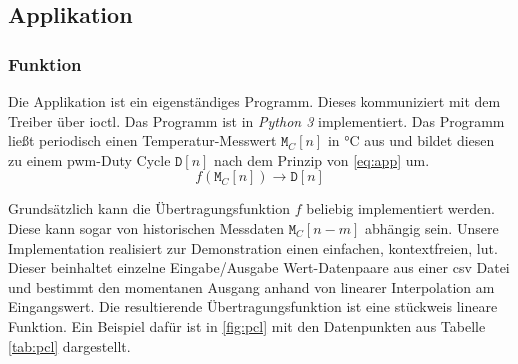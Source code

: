 \subsection{Applikation}

\subsubsection{Funktion}

Die Applikation ist ein eigenständiges Programm.
Dieses kommuniziert mit dem Treiber über \gls{ioctl}.
Das Programm ist in \textit{Python 3} implementiert.
Das Programm ließt periodisch einen Temperatur-Messwert $\texttt{M}_C[n]$ in \si{\celsius} aus und bildet diesen zu einem \gls{pwm}-Duty Cycle $\texttt{D}[n]$ nach dem Prinzip von \autoref{eq:app} um.
\begin{equation}
    f \left( \texttt{M}_C \left[n\right] \right) \rightarrow \texttt{D}\left[n\right]
    \label{eq:app}
\end{equation}

Grundsätzlich kann die Übertragungsfunktion $f$ beliebig implementiert werden.
Diese kann sogar von historischen Messdaten $\texttt{M}_C[n-m]$ abhängig sein.
Unsere Implementation realisiert zur Demonstration einen einfachen, kontextfreien, \gls{lut}.
Dieser beinhaltet einzelne Eingabe/Ausgabe Wert-Datenpaare aus einer \gls{csv} Datei und bestimmt den momentanen Ausgang anhand von linearer Interpolation am Eingangswert.
Die resultierende Übertragungsfunktion ist eine stückweis lineare Funktion.
Ein Beispiel dafür ist in \autoref{fig:pcl} mit den Datenpunkten aus Tabelle \ref{tab:pcl} dargestellt.

